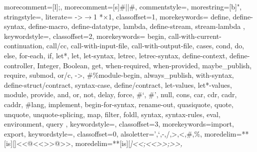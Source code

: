 \usepackage{listings}
\usepackage[dvipsnames]{xcolor}


 {
	morecomment=[l]{;},         %
	morecomment=[s]{\#|}{|\#},  %
	commentstyle={\color{ForestGreen}\slshape\sffamily},
	morestring=[b]",
	stringstyle=\color{red},
	literate=%
		{->}{{$\rightarrow$}}1
		{*}{{$\times$}}1,
	classoffset=1,
		morekeywords={
			define, define-syntax, define-macro, define-datatype, lambda, define-stream, stream-lambda
		},
		keywordstyle=\color{purple},
	classoffset=2,
		morekeywords={
			begin, call-with-current-continuation, call/cc, call-with-input-file, call-with-output-file, 
			cases, cond, do, else, for-each, if,
			let*, let, let-syntax, letrec, letrec-syntax,
			define-context, define-controller, Integer, Boolean, get, when-required, when-provided,
			maybe_publish, require, submod, or/c, ->, \#\%module-begin, always_publish, with-syntax, define-struct/contract, syntax-case, define/contract,
			let-values, let*-values,
			module, provide,
			and, or, not, 
			delay, force,
			\#`, \#',
			null, cons, car, cdr, cadr, caddr,
			\#lang, implement, begin-for-syntax, rename-out,
			quasiquote, quote, unquote, unquote-splicing,
			map, filter, foldl, syntax, syntax-rules, eval, environment, query 
		},
		keywordstyle=\color{blue},
	classoffset=3,
		morekeywords={import, export},
		keywordstyle=\color{green},
	classoffset=0,
	alsoletter={',`,-,/,>,<,\#,\%},
	moredelim=**[is][\color{lightgray}]{<<@<<}{>>@>>},
	moredelim=**[is][\itshape\color{OliveGreen}]{<<;<<}{>>;>>},
}

\newcommand{\ir}[1]{\lstinline[basicstyle=\ttfamily\normalsize,language=racket]{#1}}
